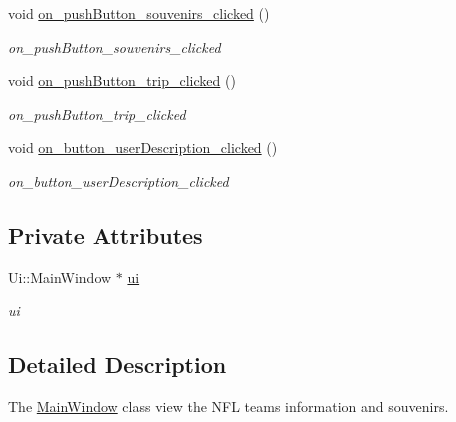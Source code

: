 \begin{DoxyCompactItemize}
void \hyperlink{class_main_window_affc3e167fce5e44e0ec8326ae6f5edfd}{on\+\_\+push\+Button\+\_\+souvenirs\+\_\+clicked} ()
\begin{DoxyCompactList}\small\item\em on\+\_\+push\+Button\+\_\+souvenirs\+\_\+clicked \end{DoxyCompactList}\item 
\mbox{\label{class_main_window_addc601f3c1fa0dfdbe022528aa5e9a51}} 
void \hyperlink{class_main_window_addc601f3c1fa0dfdbe022528aa5e9a51}{on\+\_\+push\+Button\+\_\+trip\+\_\+clicked} ()
\begin{DoxyCompactList}\small\item\em on\+\_\+push\+Button\+\_\+trip\+\_\+clicked \end{DoxyCompactList}\item 
\mbox{\label{class_main_window_a332495f940e6b028858fd2bff0d3cf9f}} 
void \hyperlink{class_main_window_a332495f940e6b028858fd2bff0d3cf9f}{on\+\_\+button\+\_\+user\+Description\+\_\+clicked} ()
\begin{DoxyCompactList}\small\item\em on\+\_\+button\+\_\+user\+Description\+\_\+clicked \end{DoxyCompactList}\end{DoxyCompactItemize}
\subsection*{Private Attributes}
\begin{DoxyCompactItemize}
\item 
\mbox{\label{class_main_window_a35466a70ed47252a0191168126a352a5}} 
Ui\+::\+Main\+Window $\ast$ \hyperlink{class_main_window_a35466a70ed47252a0191168126a352a5}{ui}
\begin{DoxyCompactList}\small\item\em ui \end{DoxyCompactList}\end{DoxyCompactItemize}


\subsection{Detailed Description}
The \hyperlink{class_main_window}{Main\+Window} class view the N\+FL teams information and souvenirs. 

